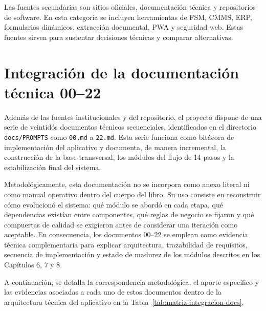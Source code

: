 Las fuentes secundarias son sitios oficiales, documentación técnica y repositorios de software. En esta categoría se incluyen herramientas de FSM, CMMS, ERP, formularios dinámicos, extracción documental, PWA y seguridad web. Estas fuentes sirven para sustentar decisiones técnicas y comparar alternativas.

\section{Integración de la documentación técnica 00--22}
\label{sec:docs-00-21}

Además de las fuentes institucionales y del repositorio, el proyecto dispone de una serie de veintidós documentos técnicos secuenciales, identificados en el directorio \texttt{docs/PROMPTS} como \texttt{00.md} a \texttt{22.md}. Esta serie funciona como bitácora de implementación del aplicativo y documenta, de manera incremental, la construcción de la base transversal, los módulos del flujo de 14 pasos y la estabilización final del sistema.

Metodológicamente, esta documentación no se incorpora como anexo literal ni como manual operativo dentro del cuerpo del libro. Su uso consiste en reconstruir cómo evolucionó el sistema: qué módulo se abordó en cada etapa, qué dependencias existían entre componentes, qué reglas de negocio se fijaron y qué compuertas de calidad se exigieron antes de considerar una iteración como aceptable. En consecuencia, los documentos 00--22 se emplean como evidencia técnica complementaria para explicar arquitectura, trazabilidad de requisitos, secuencia de implementación y estado de madurez de los módulos descritos en los Capítulos 6, 7 y 8.

A continuación, se detalla la correspondencia metodológica, el aporte específico y las evidencias asociadas a cada uno de estos documentos dentro de la arquitectura técnica del aplicativo en la Tabla~\ref{tab:matriz-integracion-docs}.


